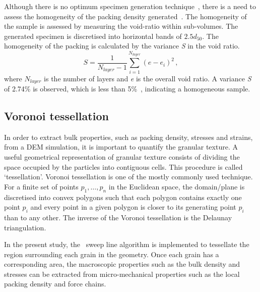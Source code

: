 Although there is no optimum specimen generation 
technique~\citep{OSullivan2011}, there is a need to assess the homogeneity of 
the packing density generated~\citep{Jiang2003}. The homogeneity of the sample 
is assessed by measuring the void-ratio within sub-volumes. The generated 
specimen is discretised into horizontal bands of $2.5d_{50}$. The homogeneity 
of the packing is calculated by the variance \textit{S} in the void ratio.
%
\begin{equation}
S=\frac{1}{N_{layer}-1}\sum\limits_{i=1}^{N_{layer}}(e - e_i)^2 \,,
\end{equation}
%
where $N_{layer}$ is the number of layers and \textit{e} is the overall void 
ratio. A variance \textit{S} of 2.74\% is observed, which is less than 
5\%~\citet{Jiang2003}, indicating a homogeneous sample.


\subsection{Voronoi tessellation}

In order to extract bulk properties, such as packing density, stresses and 
strains, from a DEM simulation, it is important to quantify the granular 
texture. A useful geometrical representation of granular texture consists of 
dividing the space occupied by the particles into contiguous cells. This 
procedure is called `tessellation'. Voronoi tessellation is one of the mostly 
commonly used technique. For a finite set of points $p_1, \dots, p_n$ in the 
Euclidean space, the domain/plane is discretised into convex polygons such that 
each polygon contains exactly one point $p_i$ and every point in a given 
polygon is closer to its generating point $p_i$ than to any other. The inverse 
of the Voronoi tessellation is the Delaunay triangulation.

In the present study, the~\citet{Fortune1992} sweep line algorithm is 
implemented to 
tessellate the region surrounding each grain in the geometry. Once each grain 
has a corresponding area, the macroscopic properties such as the bulk density 
and stresses can be extracted from micro-mechanical properties such as the 
local packing density and force chains.

